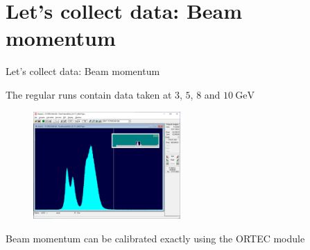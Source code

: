 \documentclass[xcolor = table]{beamer}
\begin{document}
\section{Let's collect data: Beam momentum}
\begin{frame}{Let's collect data: Beam momentum}
  \begin{center}
    The regular runs contain data taken at $3$, $5$, $8$ and $\SI{10}{\giga\eV}$
  \end{center}
  \begin{figure}
    \centering
    \includegraphics[width = 0.5\textwidth]{Plots/PionProton8GeV_221117_08h07.png}
  \end{figure}
  \begin{center}
    Beam momentum can be calibrated exactly using the ORTEC module
  \end{center}
\end{frame}
\end{document}
